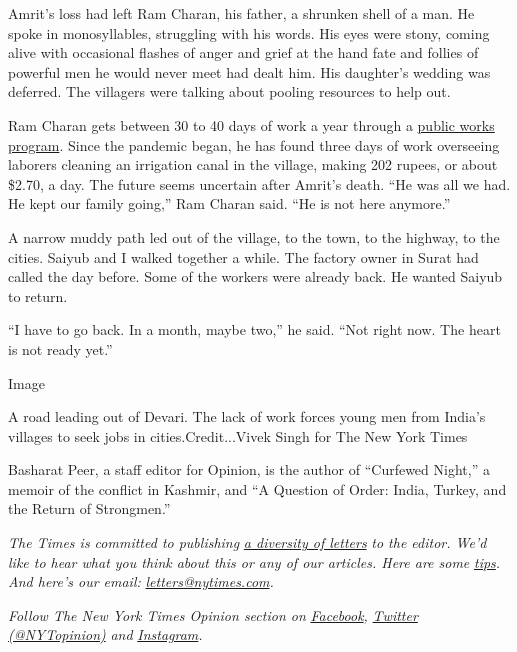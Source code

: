 Amrit's loss had left Ram Charan, his father, a shrunken shell of a man.
He spoke in monosyllables, struggling with his words. His eyes were
stony, coming alive with occasional flashes of anger and grief at the
hand fate and follies of powerful men he would never meet had dealt him.
His daughter's wedding was deferred. The villagers were talking about
pooling resources to help out.

Ram Charan gets between 30 to 40 days of work a year through a
\href{https://caravanmagazine.in/reportage/nregas-reality-check}{public
works program}. Since the pandemic began, he has found three days of
work overseeing laborers cleaning an irrigation canal in the village,
making 202 rupees, or about \$2.70, a day. The future seems uncertain
after Amrit's death. ``He was all we had. He kept our family going,''
Ram Charan said. ``He is not here anymore.''

A narrow muddy path led out of the village, to the town, to the highway,
to the cities. Saiyub and I walked together a while. The factory owner
in Surat had called the day before. Some of the workers were already
back. He wanted Saiyub to return.

``I have to go back. In a month, maybe two,'' he said. ``Not right now.
The heart is not ready yet.''

Image

A road leading out of Devari. The lack of work forces young men from
India's villages to seek jobs in cities.Credit...Vivek Singh for The New
York Times

Basharat Peer, a staff editor for Opinion, is the author of ``Curfewed
Night,'' a memoir of the conflict in Kashmir, and ``A Question of Order:
India, Turkey, and the Return of Strongmen.''

\emph{The Times is committed to publishing}
\href{https://www.nytimes.com/2019/01/31/opinion/letters/letters-to-editor-new-york-times-women.html}{\emph{a
diversity of letters}} \emph{to the editor. We'd like to hear what you
think about this or any of our articles. Here are some}
\href{https://help.nytimes.com/hc/en-us/articles/115014925288-How-to-submit-a-letter-to-the-editor}{\emph{tips}}\emph{.
And here's our email:}
\href{mailto:letters@nytimes.com}{\emph{letters@nytimes.com}}\emph{.}

\emph{Follow The New York Times Opinion section on}
\href{https://www.facebook.com/nytopinion}{\emph{Facebook}}\emph{,}
\href{http://twitter.com/NYTOpinion}{\emph{Twitter (@NYTopinion)}}
\emph{and}
\href{https://www.instagram.com/nytopinion/}{\emph{Instagram}}\emph{.}

